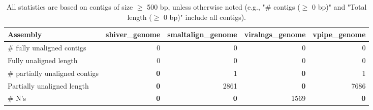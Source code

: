 \documentclass[12pt,a4paper]{article}
\begin{document}
\begin{table}[ht]
\begin{center}
\caption{All statistics are based on contigs of size $\geq$ 500 bp, unless otherwise noted (e.g., "\# contigs ($\geq$ 0 bp)" and "Total length ($\geq$ 0 bp)" include all contigs).}
\begin{tabular}{|l*{4}{|r}|}
\hline
Assembly & shiver\_genome & smaltalign\_genome & viralngs\_genome & vpipe\_genome \\ \hline
\# fully unaligned contigs & 0 & 0 & 0 & 0 \\ \hline
Fully unaligned length & 0 & 0 & 0 & 0 \\ \hline
\# partially unaligned contigs & {\bf 0} & 1 & {\bf 0} & 1 \\ \hline
Partially unaligned length & {\bf 0} & 2861 & {\bf 0} & 7686 \\ \hline
\# N's & {\bf 0} & {\bf 0} & 1569 & {\bf 0} \\ \hline
\end{tabular}
\end{center}
\end{table}
\end{document}
